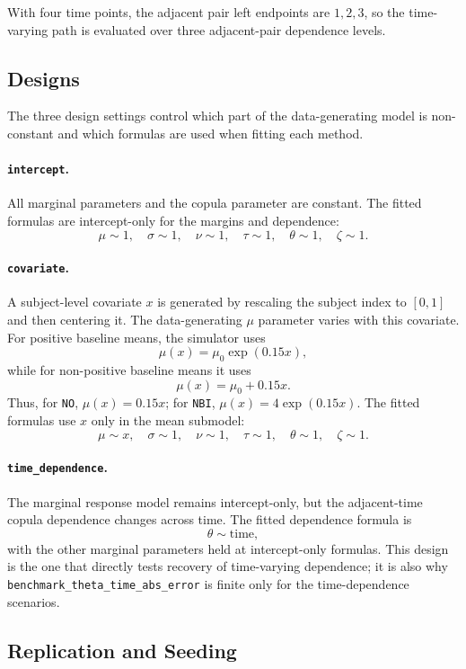 \documentclass[11pt]{article}
\begin{document}
With four time points, the adjacent pair left endpoints are \(1,2,3\), so the
time-varying path is evaluated over three adjacent-pair dependence levels.

\subsection{Designs}

The three design settings control which part of the data-generating model is
non-constant and which formulas are used when fitting each method.

\paragraph{\texttt{intercept}.}
All marginal parameters and the copula parameter are constant.  The fitted
formulas are intercept-only for the margins and dependence:
\[
\mu \sim 1,\quad \sigma \sim 1,\quad \nu \sim 1,\quad \tau \sim 1,\quad
\theta \sim 1,\quad \zeta \sim 1.
\]

\paragraph{\texttt{covariate}.}
A subject-level covariate \(x\) is generated by rescaling the subject index to
\([0,1]\) and then centering it.  The data-generating \(\mu\) parameter varies
with this covariate.  For positive baseline means, the simulator uses
\[
\mu(x) = \mu_0 \exp(0.15x),
\]
while for non-positive baseline means it uses
\[
\mu(x) = \mu_0 + 0.15x.
\]
Thus, for \texttt{NO}, \(\mu(x)=0.15x\); for \texttt{NBI},
\(\mu(x)=4\exp(0.15x)\).  The fitted formulas use \(x\) only in the mean
submodel:
\[
\mu \sim x,\quad \sigma \sim 1,\quad \nu \sim 1,\quad \tau \sim 1,\quad
\theta \sim 1,\quad \zeta \sim 1.
\]

\paragraph{\texttt{time\_dependence}.}
The marginal response model remains intercept-only, but the adjacent-time
copula dependence changes across time.  The fitted dependence formula is
\[
\theta \sim \text{time},
\]
with the other marginal parameters held at intercept-only formulas.  This
design is the one that directly tests recovery of time-varying dependence; it
is also why \texttt{benchmark\_theta\_time\_abs\_error} is finite only for the
time-dependence scenarios.

\subsection{Replication and Seeding}
\end{document}
